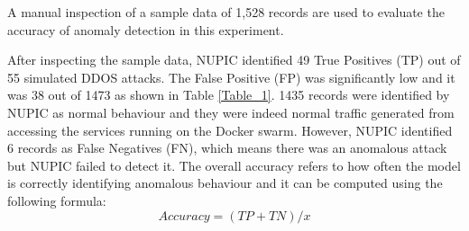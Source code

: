 \documentclass[sigconf]{acmart}
\begin{document}
A manual inspection of  a sample data of 1,528 records are used to evaluate the accuracy of anomaly detection in this experiment.  
\begin{table}[h!]
\centering

\caption{Results of the proposed anomalies detection model on confusion matrix}
\end{table}

 \begin{table}[h!]
\centering

\caption{Results of the SNORT anomaly detection on confusion matrix}
\end{table}

 
 
 
After inspecting the sample data, NUPIC identified 49 True Positives (TP) out of 55 simulated DDOS attacks. The False Positive (FP) was significantly low and it was 38 out of 1473 as shown in Table \ref{Table_1}. 1435 records were identified by NUPIC as normal behaviour and they were indeed normal traffic generated from accessing the services running on the Docker swarm. However, NUPIC identified 6 records as False Negatives (FN), which means there was an anomalous attack but NUPIC failed to detect it. The overall accuracy refers to how often the model is correctly identifying anomalous behaviour and it can be computed using the following formula: 
\[ Accuracy=  (TP+TN)/x \]
\end{document}
